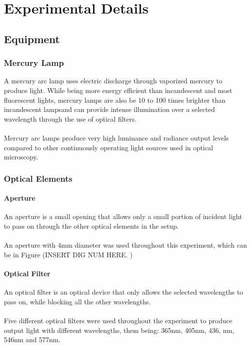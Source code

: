 \section{Experimental Details}

	\subsection{Equipment}
		
		\subsubsection{Mercury Lamp}
			A mercury arc lamp uses electric discharge through vaporized mercury to produce light. While being more energy efficient than incandescent and most fluorescent lights, mercury lamps are also be 10 to 100 times brighter than incandescent lampsand can provide intense illumination over a selected wavelength through the use of optical filters.
			\\
			\\
			Mercury arc lamps produce very high luminance and radiance output levels compared to other continuously operating light sources used in optical microscopy.
		
		\subsubsection{Optical Elements}
			\paragraph{Aperture}
				An aperture is a small opening that allows only a small portion of incident light to pass on through the other optical elements in the setup. 
				\\
				\\
				An aperture with 4mm diameter was used throughout this experiment, which can be in Figure (INSERT DIG NUM HERE.	)
			\paragraph{Optical Filter}
				An optical filter is an optical device that only allows the selected wavelengths to pass on, while blocking all the other wavelengths.
				\\
				\\
				Five different optical filters were used throughout the experiment to produce output light with different wavelengths, them being: 365nm, 405nm, 436, nm, 546nm and 577nm.
